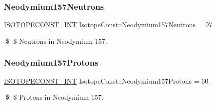 \subsubsection{\texorpdfstring{Neodymium157\+Neutrons}{Neodymium157Neutrons}}
{\footnotesize\ttfamily \mbox{\hyperlink{group___isotope_const-_macros_ga5f18360b3e99483a35c32d789e62621c}{I\+S\+O\+T\+O\+P\+E\+C\+O\+N\+S\+T\+\_\+\+I\+NT}} Isotope\+Const\+::\+Neodymium157\+Neutrons = 97}

\$ \$ Neutrons in Neodymium-\/157. \mbox{\label{group___isotope_const-_neodymium-_nd157_ga55eca161d0573940d09c4a945d98bce3}} 
\subsubsection{\texorpdfstring{Neodymium157\+Protons}{Neodymium157Protons}}
{\footnotesize\ttfamily \mbox{\hyperlink{group___isotope_const-_macros_ga5f18360b3e99483a35c32d789e62621c}{I\+S\+O\+T\+O\+P\+E\+C\+O\+N\+S\+T\+\_\+\+I\+NT}} Isotope\+Const\+::\+Neodymium157\+Protons = 60}

\$ \$ Protons in Neodymium-\/157. 